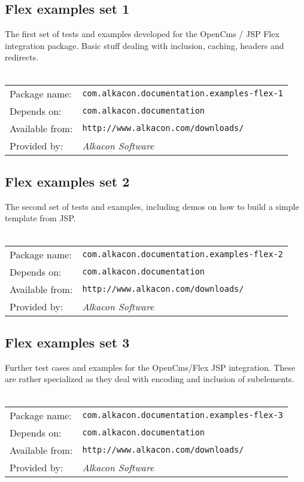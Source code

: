 \subsection{Flex examples set 1}
The first set of tests and examples developed for the OpenCms / JSP Flex integration package. 
Basic stuff dealing with inclusion, caching, headers and redirects.
\\
\\
\begin{tabular}{ll}
Package name: & {\tt com.alkacon.documentation.examples-flex-1}\\
Depends on: & {\tt com.alkacon.documentation}\\
Available from: & {\tt http://www.alkacon.com/downloads/}\\
Provided by: & {\em Alkacon Software}\\
\end{tabular}

\subsection{Flex examples set 2}
The second set of tests and examples, including demos on how to build a simple template from JSP.
\\
\\
\begin{tabular}{ll}
Package name: & {\tt com.alkacon.documentation.examples-flex-2}\\
Depends on: & {\tt com.alkacon.documentation}\\
Available from: & {\tt http://www.alkacon.com/downloads/}\\
Provided by: & {\em Alkacon Software}\\
\end{tabular}

\subsection{Flex examples set 3}
Further test cases and examples for the OpenCms/Flex JSP integration. These are rather 
specialized as they deal with encoding and inclusion of subelements.
\\
\\
\begin{tabular}{ll}
Package name: & {\tt com.alkacon.documentation.examples-flex-3}\\
Depends on: & {\tt com.alkacon.documentation}\\
Available from: & {\tt http://www.alkacon.com/downloads/}\\
Provided by: & {\em Alkacon Software}\\
\end{tabular}

